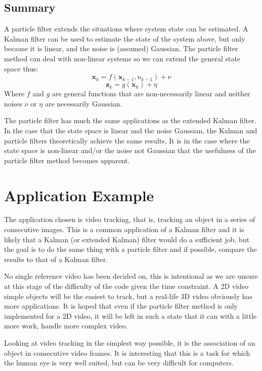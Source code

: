 \documentclass[11pt]{article}
\begin{document}
\subsection{Summary}
A particle filter extends the situations where system state can be estimated. A
Kalman filter can be used to estimate the state of the system above, but only
because it is linear, and the noise is (assumed) Gaussian. The particle filter
method can deal with non-linear systems so we can extend the general state
space thus:
\begin{equation}
\mathbf{x}_{k} = f(\mathbf{x}_{k-1}, u_{k-1}) + \nu
\end{equation}
\begin{equation}
\mathbf{z}_{k} = g(\mathbf{x}_{k}) + \eta
\end{equation}
Where $f$ and $g$ are general functions that are non-necessarily linear and
neither noises $\nu$ or $\eta$ are necessarily Gaussian.

The particle filter has much the same applications as the extended Kalman
filter. In the case that the state space is linear and the noise Gaussian, the
Kalman and particle filters theoretically achieve the same results. It is in
the case where the state space is non-linear and/or the noise not Gaussian that
the usefulness of the particle filter method becomes apparent.

\section{Application Example}\label{sec:application}
The application chosen is video tracking, that is, tracking an object in a
series of consecutive images.  This is a common application of a Kalman filter
and it is likely that a Kalman (or extended Kalman) filter would do a sufficient
job, but the goal is to do the same thing with a particle filter and if
possible, compare the results to that of a Kalman filter.

No single reference video has been decided on, this is intentional as we are
unsure at this stage of the difficulty of the code given the time constraint. A
2D video simple objects will be the easiest to track, but a real-life 3D video
obviously has more applications. It is hoped that even if the particle filter
method is only implemented for a 2D video, it will be left in such a state that
it can with a little more work, handle more complex video.

Looking at video tracking in the simplest way possible, it is the association of
an object in consecutive video frames. It is interesting that this is a task
for which the human eye is very well suited, but can be very difficult for
computers. 
\end{document}
